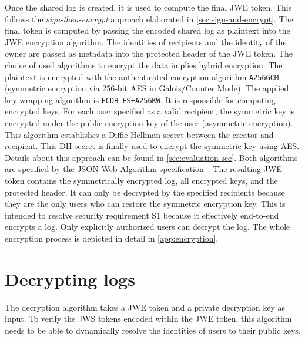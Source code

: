 \documentclass[../main.tex]{subfiles}
\begin{document}
Once the  shared log is created, it is used to compute the final JWE token.
This follows the \emph{sign-then-encrypt} approach elaborated in \cref{sec:sign-and-encrypt}.
The final token is computed by passing the encoded shared log as plaintext into the JWE encryption algorithm.
The identities of recipients and the identity of the owner are passed as metadata into the protected header of the JWE token.
The choice of used algorithms to encrypt the data implies hybrid encryption:
The plaintext is encrypted with the authenticated encryption algorithm \verb|A256GCM| (symmetric encryption via 256-bit AES in Galois/Counter Mode).
The applied key-wrapping algorithm is \verb|ECDH-ES+A256KW|.
It is responsible for computing encrypted keys.
For each user specified as a valid recipient, the symmetric key is encrypted under the public encryption key of the user (asymmetric encryption).
This algorithm establishes a Diffie-Hellman secret between the creator and recipient.
This DH-secret is finally used to encrypt the symmetric key using AES.
Details about this approach can be found in \cref{sec:evaluation-sec}.
Both algorithms are specified by the JSON Web Algorithm specification~\cite{JWA2015}.
The resulting JWE token contains the symmetrically encrypted log, all encrypted keys, and the protected header.
It can only be decrypted by the specified recipients because they are the only users who can restore the symmetric encryption key.
This is intended to resolve security requirement S1 because it effectively end-to-end encrypts a log.
Only explicitly authorized users can decrypt the log.
The whole encryption process is depicted in detail in \cref{app:encryption}.

\section{Decrypting logs}\label{sec:decrypting}

The decryption algorithm takes a JWE token and a private decryption key as input.
To verify the JWS tokens encoded within the JWE token, this algorithm needs to be able to dynamically resolve the identities of users to their public keys.
\end{document}
